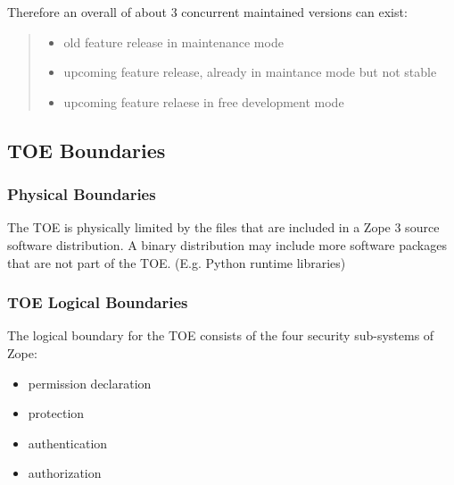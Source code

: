 \documentclass[10pt,a4paper,english]{article}
\begin{document}
Therefore an overall of about 3 concurrent maintained versions can exist:
\begin{quote}
\begin{itemize}
\item {} 
old feature release in maintenance mode

\item {} 
upcoming feature release, already in maintance mode but not stable

\item {} 
upcoming feature relaese in free development mode

\end{itemize}
\end{quote}



\hypertarget{toe-boundaries}{}
\subsection*{TOE Boundaries}



\hypertarget{physical-boundaries}{}
\subsubsection*{Physical Boundaries}

The TOE is physically limited by the files that are included in a Zope 3
source software distribution. A binary distribution may include more software
packages that are not part of the TOE. (E.g. Python runtime libraries)



\hypertarget{toe-logical-boundaries}{}
\subsubsection*{TOE Logical Boundaries}

The logical boundary for the TOE consists of the four security sub-systems of
Zope:
\begin{itemize}
\item {} 
permission declaration

\item {} 
protection

\item {} 
authentication

\item {} 
authorization

\end{itemize}
\end{document}
